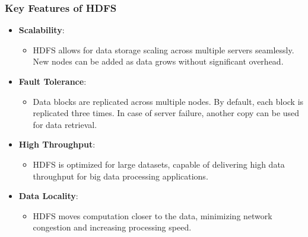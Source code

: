 \documentclass[aspectratio=169]{beamer}
\begin{document}
\begin{frame}[fragile]
    \frametitle{Key Features of HDFS}
    \begin{itemize}
        \item \textbf{Scalability}:
        \begin{itemize}
            \item HDFS allows for data storage scaling across multiple servers seamlessly. New nodes can be added as data grows without significant overhead.
        \end{itemize}
        
        \item \textbf{Fault Tolerance}:
        \begin{itemize}
            \item Data blocks are replicated across multiple nodes. By default, each block is replicated three times. In case of server failure, another copy can be used for data retrieval.
        \end{itemize}

        \item \textbf{High Throughput}:
        \begin{itemize}
            \item HDFS is optimized for large datasets, capable of delivering high data throughput for big data processing applications.
        \end{itemize}

        \item \textbf{Data Locality}:
        \begin{itemize}
            \item HDFS moves computation closer to the data, minimizing network congestion and increasing processing speed.
        \end{itemize}
    \end{itemize}
\end{frame}
\end{document}
